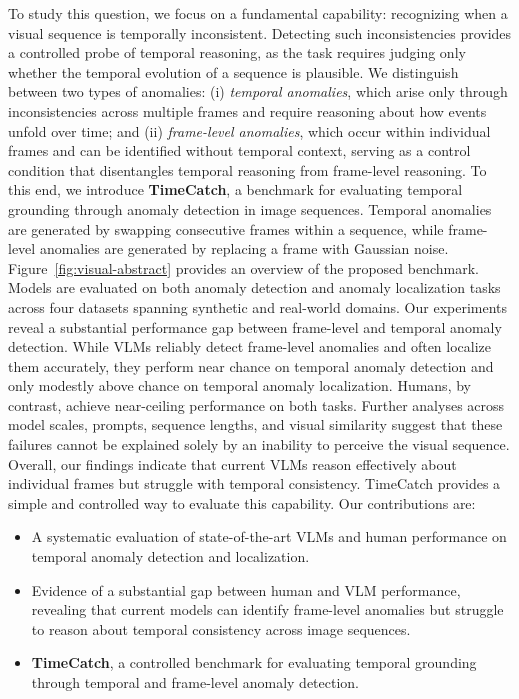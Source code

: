 \documentclass[11pt]{article}
\begin{document}
To study this question, we focus on a fundamental capability: recognizing when a visual sequence is temporally inconsistent. Detecting such inconsistencies provides a controlled probe of temporal reasoning, as the task requires judging only whether the temporal evolution of a sequence is plausible. We distinguish between two types of anomalies: (i) \emph{temporal anomalies}, which arise only through inconsistencies across multiple frames and require reasoning about how events unfold over time; and (ii) \emph{frame-level anomalies}, which occur within individual frames and can be identified without temporal context, serving as a control condition that disentangles temporal reasoning from frame-level reasoning. To this end, we introduce \textbf{TimeCatch}, a benchmark for evaluating temporal grounding through anomaly detection in image sequences. Temporal anomalies are generated by swapping consecutive frames within a sequence, while frame-level anomalies are generated by replacing a frame with Gaussian noise. Figure~\ref{fig:visual-abstract} provides an overview of the proposed benchmark. Models are evaluated on both anomaly detection and anomaly localization tasks across four datasets spanning synthetic and real-world domains.
Our experiments reveal a substantial performance gap between frame-level and temporal anomaly detection. While VLMs reliably detect frame-level anomalies and often localize them accurately, they perform near chance on temporal anomaly detection and only modestly above chance on temporal anomaly localization. Humans, by contrast, achieve near-ceiling performance on both tasks. Further analyses across model scales, prompts, sequence lengths, and visual similarity suggest that these failures cannot be explained solely by an inability to perceive the visual sequence.
Overall, our findings indicate that current VLMs reason effectively about individual frames but struggle with temporal consistency. TimeCatch provides a simple and controlled way to evaluate this capability. Our contributions are:

\begin{itemize}
    \item A systematic evaluation of state-of-the-art VLMs and human performance on temporal anomaly detection and localization.

    \item Evidence of a substantial gap between human and VLM performance, revealing that current models can identify frame-level anomalies but struggle to reason about temporal consistency across image sequences.

    \item \textbf{TimeCatch}, a controlled benchmark for evaluating temporal grounding through temporal and frame-level anomaly detection.
\end{itemize}
\end{document}
